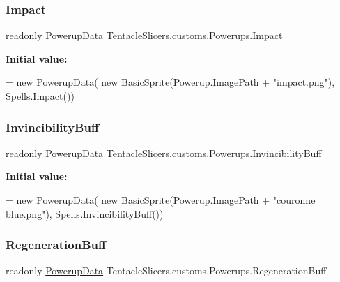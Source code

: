 \subsubsection{\texorpdfstring{Impact}{Impact}}
{\footnotesize\ttfamily readonly \hyperlink{class_tentacle_slicers_1_1actors_1_1_powerup_data}{Powerup\+Data} Tentacle\+Slicers.\+customs.\+Powerups.\+Impact\hspace{0.3cm}{\ttfamily [static]}}

{\bfseries Initial value\+:}
\begin{DoxyCode}
= \textcolor{keyword}{new} PowerupData(
            \textcolor{keyword}{new} BasicSprite(Powerup.ImagePath + \textcolor{stringliteral}{"impact.png"}), Spells.Impact())
\end{DoxyCode}
\mbox{\label{class_tentacle_slicers_1_1customs_1_1_powerups_ac8cd1347969fcb4329e20e7ef8453679}} 
\subsubsection{\texorpdfstring{Invincibility\+Buff}{InvincibilityBuff}}
{\footnotesize\ttfamily readonly \hyperlink{class_tentacle_slicers_1_1actors_1_1_powerup_data}{Powerup\+Data} Tentacle\+Slicers.\+customs.\+Powerups.\+Invincibility\+Buff\hspace{0.3cm}{\ttfamily [static]}}

{\bfseries Initial value\+:}
\begin{DoxyCode}
= \textcolor{keyword}{new} PowerupData(
            \textcolor{keyword}{new} BasicSprite(Powerup.ImagePath + \textcolor{stringliteral}{"couronne blue.png"}), Spells.InvincibilityBuff())
\end{DoxyCode}
\mbox{\label{class_tentacle_slicers_1_1customs_1_1_powerups_a042798901b315304e162efc4467fcdc3}} 
\subsubsection{\texorpdfstring{Regeneration\+Buff}{RegenerationBuff}}
{\footnotesize\ttfamily readonly \hyperlink{class_tentacle_slicers_1_1actors_1_1_powerup_data}{Powerup\+Data} Tentacle\+Slicers.\+customs.\+Powerups.\+Regeneration\+Buff\hspace{0.3cm}{\ttfamily [static]}}


